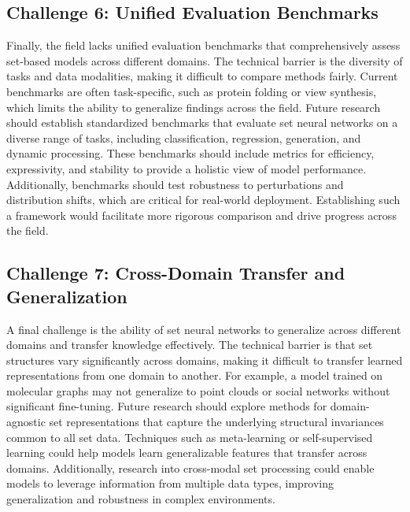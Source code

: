 \documentclass{article}
\begin{document}
\subsection{Challenge 6: Unified Evaluation Benchmarks}

\label{sec:challenge_6_unified_evaluation_benchmark}

Finally, the field lacks unified evaluation benchmarks that comprehensively assess set-based models across different domains. The technical barrier is the diversity of tasks and data modalities, making it difficult to compare methods fairly. Current benchmarks are often task-specific, such as protein folding or view synthesis, which limits the ability to generalize findings across the field. Future research should establish standardized benchmarks that evaluate set neural networks on a diverse range of tasks, including classification, regression, generation, and dynamic processing. These benchmarks should include metrics for efficiency, expressivity, and stability to provide a holistic view of model performance. Additionally, benchmarks should test robustness to perturbations and distribution shifts, which are critical for real-world deployment. Establishing such a framework would facilitate more rigorous comparison and drive progress across the field.

\subsection{Challenge 7: Cross-Domain Transfer and Generalization}

\label{sec:challenge_7_cross_domain_transfer_and_ge}

A final challenge is the ability of set neural networks to generalize across different domains and transfer knowledge effectively. The technical barrier is that set structures vary significantly across domains, making it difficult to transfer learned representations from one domain to another. For example, a model trained on molecular graphs may not generalize to point clouds or social networks without significant fine-tuning. Future research should explore methods for domain-agnostic set representations that capture the underlying structural invariances common to all set data. Techniques such as meta-learning or self-supervised learning could help models learn generalizable features that transfer across domains. Additionally, research into cross-modal set processing could enable models to leverage information from multiple data types, improving generalization and robustness in complex environments.
\end{document}
